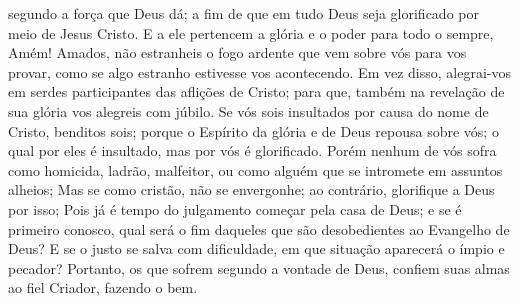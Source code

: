 {{} segundo a força que Deus dá; a fim de que em tudo Deus seja glorificado por meio de Jesus Cristo. E a ele pertencem a glória e o poder para todo o sempre, Amém!
  Amados, não estranheis o fogo ardente que vem sobre vós para vos provar, como se algo estranho estivesse vos acontecendo.
  Em vez disso, alegrai-vos em serdes participantes das aflições de Cristo; para que, também na revelação de sua glória vos alegreis com júbilo.
  Se vós sois insultados por causa do nome de Cristo, benditos
 sois; porque o Espírito da glória e de Deus repousa sobre vós; o qual por eles é insultado, mas por vós é glorificado.
  Porém nenhum de vós sofra como homicida, ladrão, malfeitor, ou como alguém que se intromete em assuntos alheios;
  Mas se
{} como cristão, não se envergonhe; ao contrário, glorifique a Deus por isso;
  Pois já é tempo do julgamento começar pela casa de Deus; e se é primeiro conosco, qual será o fim daqueles que são desobedientes ao Evangelho de Deus?
  E se o justo se salva com dificuldade, em que situação aparecerá o ímpio e pecador?
{}
  Portanto, os que sofrem segundo a vontade de Deus, confiem suas almas ao fiel Criador, fazendo o bem.
\par }

